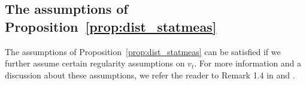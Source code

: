 \subsection{The assumptions of Proposition~\ref{prop:dist_statmeas}}

The assumptions of Proposition~\ref{prop:dist_statmeas} can be satisfied if we further assume certain regularity assumptions on $v_t$. For more information and a discussion about these assumptions, we refer the reader to Remark 1.4 in \cite{bogachev2016distances} and \cite{bogachev2006global,bogachev2008estimates}.



